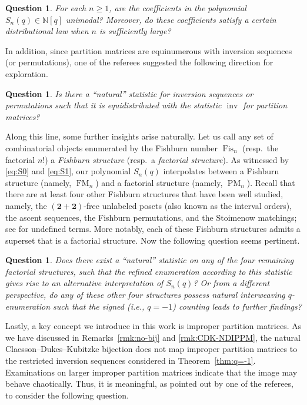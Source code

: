 \documentclass[12pt,reqno]{amsart}
\numberwithin{equation}{section}
\theoremstyle{theorem}
\newtheorem{question}[theorem]{Question}
\theoremstyle{definition}
\theoremstyle{named}
\newcommand{\Fis}{\operatorname{Fis}}
\newcommand{\MatF}{\operatorname{FM}}
\newcommand{\MatP}{\operatorname{PM}}
\newcommand{\inv}{\operatorname{inv}}
\begin{document}
\begin{question}
	For each $n\ge 1$, are the coefficients in the polynomial $S_n(q)\in \mathbb{N}[q]$ unimodal? Moreover, do these coefficients satisfy a certain distributional law when $n$ is sufficiently large?
\end{question}

In addition, since partition matrices are equinumerous with inversion sequences (or permutations), one of the referees suggested the following direction for exploration.

\begin{question}
	Is there a ``natural'' statistic for inversion sequences or permutations such that it is equidistributed with the statistic $\inv$ for partition matrices?
\end{question}

Along this line, some further insights arise naturally. Let us call any set of combinatorial objects enumerated by the Fishburn number $\Fis_n$ (resp.~the factorial $n!$) a \emph{Fishburn structure} (resp.~a \emph{factorial structure}). As witnessed by \eqref{eq:S0} and \eqref{eq:S1}, our polynomial $S_n(q)$ interpolates between a Fishburn structure (namely, $\MatF_n$) and a factorial structure (namely, $\MatP_n$). Recall that there are at least four other Fishburn structures that have been well studied, namely, the $(\mathbf{2}+\mathbf{2})$-free unlabeled posets (also known as the interval orders), the ascent sequences, the Fishburn permutations, and the Stoimenow matchings; see \cite{BCDK2010} for undefined terms. More notably, each of these Fishburn structures admits a superset that is a factorial structure. Now the following question seems pertinent.

\begin{question}
	Does there exist a ``natural'' statistic on any of the four remaining factorial structures, such that the refined enumeration according to this statistic gives rise to an alternative interpretation of $S_n(q)$? Or from a different perspective, do any of these other four structures possess natural interweaving $q$-enumeration such that the signed (i.e., $q=-1$) counting leads to further findings?
\end{question}

Lastly, a key concept we introduce in this work is improper partition matrices. As we have discussed in Remarks~\ref{rmk:no-bij} and \ref{rmk:CDK-NDIPPM}, the natural Claesson--Dukes--Kubitzke bijection does not map improper partition matrices to the restricted inversion sequences considered in Theorem~\ref{thm:q=-1}. Examinations on larger improper partition matrices indicate that the image may behave chaotically. Thus, it is meaningful, as pointed out by one of the referees, to consider the following question.
\end{document}
